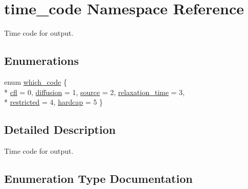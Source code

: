 \hypertarget{namespacetime__code}{}\section{time\+\_\+code Namespace Reference}
\label{namespacetime__code}


Time code for output.  


\subsection*{Enumerations}
\begin{DoxyCompactItemize}
\item 
enum \hyperlink{namespacetime__code_a92eaf5cbf7ef106eae01fd0d702e36bf}{which\+\_\+code} \{ \\*
\hyperlink{namespacetime__code_a92eaf5cbf7ef106eae01fd0d702e36bfadfdeaad007a568dfec84fded508edcc6}{cfl} = 0, 
\hyperlink{namespacetime__code_a92eaf5cbf7ef106eae01fd0d702e36bfa9dbb45c7fe15d4b6fd1d32f93e98c873}{diffusion} = 1, 
\hyperlink{namespacetime__code_a92eaf5cbf7ef106eae01fd0d702e36bfade9d7a14fddc46cf65f97e3ce97ff191}{source} = 2, 
\hyperlink{namespacetime__code_a92eaf5cbf7ef106eae01fd0d702e36bfa46e4343c029bcd52ee62e31b83d26069}{relaxation\+\_\+time} = 3, 
\\*
\hyperlink{namespacetime__code_a92eaf5cbf7ef106eae01fd0d702e36bfae3eec55b184aa2d33a7a79dc6204d955}{restricted} = 4, 
\hyperlink{namespacetime__code_a92eaf5cbf7ef106eae01fd0d702e36bfa02d59025dbc762856770099063cc53af}{hardcap} = 5
 \}
\end{DoxyCompactItemize}


\subsection{Detailed Description}
Time code for output. 

\subsection{Enumeration Type Documentation}

